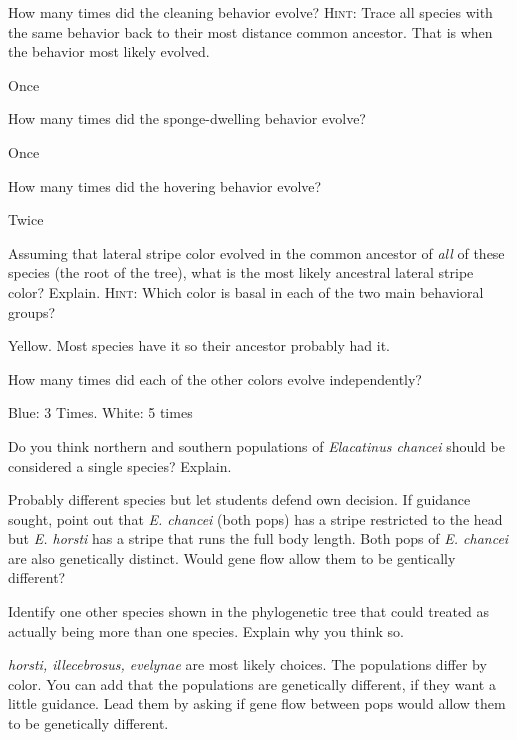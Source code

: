 \documentclass[12pt, hidelinks]{exam}
\newcommand*\AnswerBox[2]{%
    \parbox[t][#1]{0.92\textwidth}{%
    \begin{solution}#2\end{solution}}
    \vspace{\stretch{1}}
}
\begin{document}
\begin{questions}

\question
How many times did the cleaning behavior evolve? \textsc{Hint:} 
Trace all species with the same behavior back to their most distance common ancestor.
That is when the behavior most likely evolved. 

\AnswerBox{\baselineskip}{Once}

\question
How many times did the sponge-dwelling behavior evolve?

\AnswerBox{\baselineskip}{Once}

\question
How many times did the hovering behavior evolve?

\AnswerBox{\baselineskip}{Twice}

\question
Assuming that lateral stripe color evolved in the common ancestor
of \emph{all} of these species (the root of the tree), what is the most likely ancestral lateral
stripe color? Explain. \textsc{Hint:} Which color is basal in each of the two main behavioral groups?

\AnswerBox{3\baselineskip}{Yellow. Most species have it so their ancestor probably had it.}

\question
How many times did each of the other colors evolve independently?

\AnswerBox{2\baselineskip}{Blue: 3 Times. \quad White: 5 times}


\question
Do you think northern and southern populations of 
\textit{Elacatinus chancei} should be considered a single species?
Explain.

\AnswerBox{3\baselineskip}{Probably different species but let students defend own decision. 
If guidance sought, point out that \textit{E. chancei} (both pops) has a stripe restricted to the head
but \textit{E. horsti} has a stripe that runs the full body length. Both pops of \textit{E. chancei} are also
genetically distinct. Would gene flow allow them to be gentically different?}

\question
Identify one other species shown in the phylogenetic tree
that could treated as actually being more than one species. Explain why you think so.

\AnswerBox{3\baselineskip}{\textit{horsti, illecebrosus, evelynae} are most likely choices. 
The populations differ by color. You can add that the populations are genetically different, if 
they want a little guidance. Lead them by asking if gene flow between pops would allow them
to be genetically different.}

%
%

\end{questions}
\end{document}
